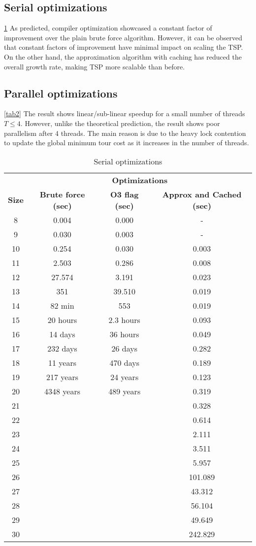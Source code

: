 \documentclass[conference]{IEEEtran}
\begin{document}
\subsection{Serial optimizations}
\ref{tab1} As predicted, compiler optimization showcased a constant factor of improvement over the plain brute force algorithm. However, it can be observed that constant factors of improvement have minimal impact on scaling the TSP. On the other hand, the approximation algorithm with caching has reduced the overall growth rate, making TSP more scalable than before. 


\subsection{Parallel optimizations}
\ref{tab2} The result shows linear/sub-linear speedup for a small number of threads $T\leq 4$. However, unlike the theoretical prediction, the result shows poor parallelism after 4 threads. The main reason is due to the heavy lock contention to update the global minimum tour cost as it increases in the number of threads. 

\begin{table}[htbp]
\caption{Serial optimizations}
\begin{center}
\begin{tabular}{|c|c|c|c|}
\hline
\textbf{}&\multicolumn{3}{|c|}{\textbf{Optimizations}} \\
\cline{2-4} 
\textbf{Size} & \textbf{Brute force (sec)}& \textbf{O3 flag (sec)}& \textbf{Approx and Cached (sec)} \\
\hline
8& 0.004& 0.000& - \\
9& 0.030& 0.003& - \\
10& 0.254& 0.030& 0.003 \\
11& 2.503& 0.286& 0.008 \\
12& 27.574& 3.191& 0.023 \\
13& 351& 39.510& 0.019 \\
14& 82 min& 553 & 0.019  \\
15& 20 hours& 2.3 hours & 0.093 \\
16& 14 days& 36 hours & 0.049 \\
17& 232 days& 26 days & 0.282 \\
18& 11 years& 470 days & 0.189 \\
19& 217 years& 24 years & 0.123 \\
20& 4348 years& 489 years & 0.319 \\
21& & & 0.328 \\
22& & & 0.614 \\
23& & & 2.111 \\
24& & & 3.511 \\
25& & & 5.957 \\
26& & & 101.089 \\
27& & & 43.312 \\
28& & & 56.104 \\
29& & & 49.649 \\
30& & & 242.829 \\
\hline
\end{tabular}
\label{tab1}
\end{center}
\end{table}
\end{document}
